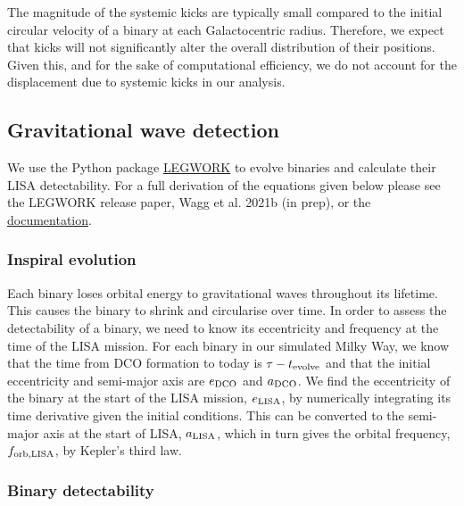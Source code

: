 The magnitude of the systemic kicks are typically small compared to the initial circular velocity of a binary at each Galactocentric radius. Therefore, we expect that kicks will not significantly alter the overall distribution of their positions. Given this, and for the sake of computational efficiency, we do not account for the displacement due to systemic kicks in our analysis.

\subsection{Gravitational wave detection}\label{sec:gw_detection}
We use the Python package \href{https://legwork.readthedocs.io/en/latest/}{LEGWORK} to evolve binaries and calculate their LISA detectability. For a full derivation of the equations given below please see the LEGWORK release paper, Wagg et al. 2021b (in prep), or the \href{https://legwork.readthedocs.io/en/latest/notebooks/Derivations.html}{documentation}.

\subsubsection{Inspiral evolution}

Each binary loses orbital energy to gravitational waves throughout its lifetime. This causes the binary to shrink and circularise over time. In order to assess the detectability of a binary, we need to know its eccentricity and frequency at the time of the LISA mission. For each binary in our simulated Milky Way, we know that the time from DCO formation to today is $\tau - t_{\rm evolve}$ and that the initial eccentricity and semi-major axis are $e_{\rm DCO}$ and $a_{\rm DCO}$. We find the eccentricity of the binary at the start of the LISA mission, $e_{\rm LISA}$, by numerically integrating its time derivative \citep[][Eq. 5.13]{Peters+1964} given the initial conditions. This can be converted to the semi-major axis at the start of LISA, $a_{\rm LISA} $\citep[][Eq. 5.11]{Peters+1964}, which in turn gives the orbital frequency, $f_{\rm orb, LISA}$, by Kepler's third law.

\subsubsection{Binary detectability}

